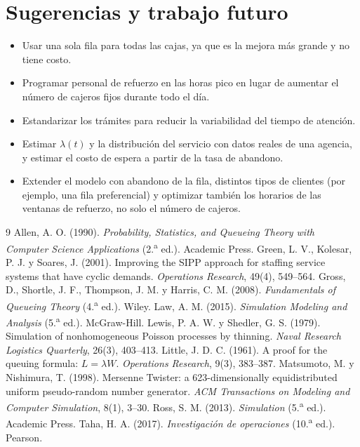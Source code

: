 \documentclass[11pt,letterpaper]{article}
\begin{document}
\section{Sugerencias y trabajo futuro}
\begin{itemize}
  \item Usar una sola fila para todas las cajas, ya que es la mejora más grande y no
        tiene costo.
  \item Programar personal de refuerzo en las horas pico en lugar de aumentar el número
        de cajeros fijos durante todo el día.
  \item Estandarizar los trámites para reducir la variabilidad del tiempo de atención.
  \item Estimar $\lambda(t)$ y la distribución del servicio con datos reales de una
        agencia, y estimar el costo de espera a partir de la tasa de abandono.
  \item Extender el modelo con abandono de la fila, distintos tipos de clientes
        (por ejemplo, una fila preferencial) y optimizar también los horarios de las
        ventanas de refuerzo, no solo el número de cajeros.
\end{itemize}

\begin{thebibliography}{9}
 Allen, A. O. (1990). \emph{Probability, Statistics, and Queueing Theory with Computer Science Applications} (2.\textsuperscript{a} ed.). Academic Press.
 Green, L. V., Kolesar, P. J. y Soares, J. (2001). Improving the SIPP approach for staffing service systems that have cyclic demands. \emph{Operations Research}, 49(4), 549--564.
 Gross, D., Shortle, J. F., Thompson, J. M. y Harris, C. M. (2008). \emph{Fundamentals of Queueing Theory} (4.\textsuperscript{a} ed.). Wiley.
 Law, A. M. (2015). \emph{Simulation Modeling and Analysis} (5.\textsuperscript{a} ed.). McGraw-Hill.
 Lewis, P. A. W. y Shedler, G. S. (1979). Simulation of nonhomogeneous Poisson processes by thinning. \emph{Naval Research Logistics Quarterly}, 26(3), 403--413.
 Little, J. D. C. (1961). A proof for the queuing formula: $L = \lambda W$. \emph{Operations Research}, 9(3), 383--387.
 Matsumoto, M. y Nishimura, T. (1998). Mersenne Twister: a 623-dimensionally equidistributed uniform pseudo-random number generator. \emph{ACM Transactions on Modeling and Computer Simulation}, 8(1), 3--30.
 Ross, S. M. (2013). \emph{Simulation} (5.\textsuperscript{a} ed.). Academic Press.
 Taha, H. A. (2017). \emph{Investigación de operaciones} (10.\textsuperscript{a} ed.). Pearson.
\end{thebibliography}
\end{document}
